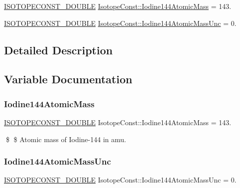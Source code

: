 \begin{DoxyCompactItemize}
\item 
\mbox{\hyperlink{group___isotope_const-_macros_ga8f45a7272ce02c0b4c65c44636ed719a}{I\+S\+O\+T\+O\+P\+E\+C\+O\+N\+S\+T\+\_\+\+D\+O\+U\+B\+LE}} \mbox{\hyperlink{group___isotope_const-_iodine-_i144_gadadb37b6f319ca1d9782e00e12770593}{Isotope\+Const\+::\+Iodine144\+Atomic\+Mass}} = 143.
\item 
\mbox{\hyperlink{group___isotope_const-_macros_ga8f45a7272ce02c0b4c65c44636ed719a}{I\+S\+O\+T\+O\+P\+E\+C\+O\+N\+S\+T\+\_\+\+D\+O\+U\+B\+LE}} \mbox{\hyperlink{group___isotope_const-_iodine-_i144_gace8989b516d923cc9ca81a930c028e11}{Isotope\+Const\+::\+Iodine144\+Atomic\+Mass\+Unc}} = 0.
\end{DoxyCompactItemize}


\subsection{Detailed Description}


\subsection{Variable Documentation}
\mbox{\label{group___isotope_const-_iodine-_i144_gadadb37b6f319ca1d9782e00e12770593}} 
\subsubsection{\texorpdfstring{Iodine144\+Atomic\+Mass}{Iodine144AtomicMass}}
{\footnotesize\ttfamily \mbox{\hyperlink{group___isotope_const-_macros_ga8f45a7272ce02c0b4c65c44636ed719a}{I\+S\+O\+T\+O\+P\+E\+C\+O\+N\+S\+T\+\_\+\+D\+O\+U\+B\+LE}} Isotope\+Const\+::\+Iodine144\+Atomic\+Mass = 143.}

\$ \$ Atomic mass of Iodine-\/144 in amu. \mbox{\label{group___isotope_const-_iodine-_i144_gace8989b516d923cc9ca81a930c028e11}} 
\subsubsection{\texorpdfstring{Iodine144\+Atomic\+Mass\+Unc}{Iodine144AtomicMassUnc}}
{\footnotesize\ttfamily \mbox{\hyperlink{group___isotope_const-_macros_ga8f45a7272ce02c0b4c65c44636ed719a}{I\+S\+O\+T\+O\+P\+E\+C\+O\+N\+S\+T\+\_\+\+D\+O\+U\+B\+LE}} Isotope\+Const\+::\+Iodine144\+Atomic\+Mass\+Unc = 0.}

